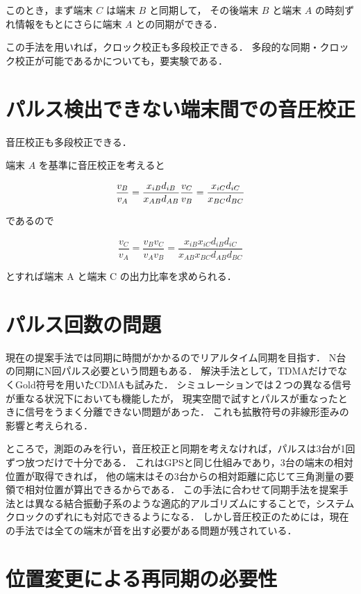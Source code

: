 このとき，まず端末 $C$ は端末 $B$ と同期して，
その後端末 $B$ と端末 $A$ の時刻ずれ情報をもとにさらに端末 $A$ との同期ができる．

この手法を用いれば，クロック校正も多段校正できる．
多段的な同期・クロック校正が可能であるかについても，要実験である．

\section{パルス検出できない端末間での音圧校正}
音圧校正も多段校正できる．


端末 $A$ を基準に音圧校正を考えると

$$
\frac{v_B}{v_A} = \frac{x_{iB} d_{iB}}{x_{AB}d_{AB}} \\
\frac{v_C}{v_B} = \frac{x_{iC} d_{iC}}{x_{BC}d_{BC}} \\
$$

であるので

$$
\frac{v_C}{v_A} =
\frac{v_B v_C}{v_A v_B} =
\frac{x_{iB} x_{iC} d_{iB} d_{iC}}{x_{AB} x_{BC} d_{AB} d_{BC}}
$$

とすれば端末 A と端末 C の出力比率を求められる．







\section{パルス回数の問題}

現在の提案手法では同期に時間がかかるのでリアルタイム同期を目指す．
N台の同期にN回パルス必要という問題もある．
解決手法として，TDMAだけでなくGold符号を用いたCDMAも試みた．
シミュレーションでは２つの異なる信号が重なる状況下においても機能したが，
現実空間で試すとパルスが重なったときに信号をうまく分離できない問題があった．
これも拡散符号の非線形歪みの影響と考えられる．

ところで，測距のみを行い，音圧校正と同期を考えなければ，パルスは3台が1回ずつ放つだけで十分である．
これはGPSと同じ仕組みであり，3台の端末の相対位置が取得できれば，
他の端末はその3台からの相対距離に応じて三角測量の要領で相対位置が算出できるからである．
この手法に合わせて同期手法を提案手法とは異なる結合振動子系\cite{合原一究, 谷口義明, 木村宏人}のような適応的アルゴリズムにすることで，システムクロックのずれにも対応できるようになる．
しかし音圧校正のためには，現在の手法では全ての端末が音を出す必要がある問題が残されている．



\section{位置変更による再同期の必要性}

